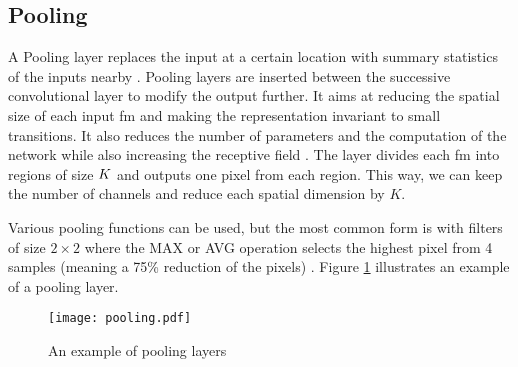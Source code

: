 \subsection{Pooling} \label{subs:pooling}
A Pooling layer replaces the input at a certain location with summary statistics of the inputs nearby \cite{goodfellow_deep_2016}. Pooling layers are inserted between the successive convolutional layer to modify the output further. It aims at reducing the spatial size of each input \acrshort{fm} and making the representation invariant to small transitions. It also reduces the number of parameters and the computation of the network while also increasing the receptive field \cite{shawahna_fpga-based_2019}. The layer divides each \acrshort{fm} into regions of size $K \title K$ and outputs one pixel from each region. This way, we can keep the number of channels and reduce each spatial dimension by $K$.

Various pooling functions can be used, but the most common form is with filters of size $2 \times 2$ where the MAX or AVG operation selects the highest pixel from 4 samples (meaning a 75\% reduction of the pixels) \cite{suda_throughput-optimized_2016}. Figure \ref{fig:pool} illustrates an example of a pooling layer.
%
\begin{figure}
    \centering
    \texttt{[image: pooling.pdf]}
    \caption{An example of pooling layers}
    \label{fig:pool}
\end{figure}
